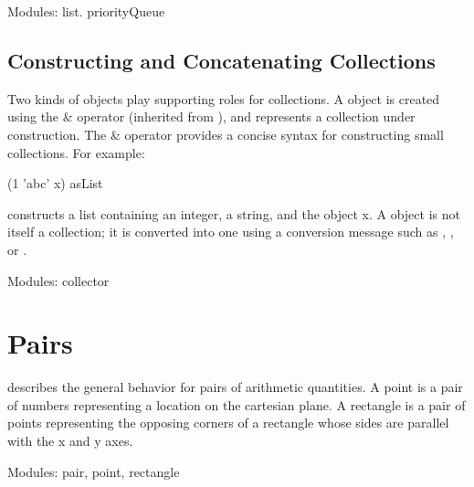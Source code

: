 \documentclass[letterpaper,10pt,english]{sphinxmanual}
\begin{document}
Modules: list. priorityQueue


\subsection{Constructing and Concatenating Collections}
\label{\detokenize{collections:constructing-and-concatenating-collections}}
\begin{sphinxVerbatim}[commandchars=\\\{\}]
\end{sphinxVerbatim}

Two kinds of objects play supporting roles for collections. A  object is created using
the \& operator (inherited from ), and represents a collection under construction.
The \& operator provides a concise syntax for constructing small collections. For example:

\begin{sphinxVerbatim}[commandchars=\\\{\}]
(1 \PYGZam{} ’abc’ \PYGZam{} x) asList
\end{sphinxVerbatim}

constructs a list containing an integer, a string, and the object x. A  object is not itself
a collection; it is converted into one using a conversion message such as , , or
.

Modules: collector


\section{Pairs}
\label{\detokenize{pairs:pairs}}\label{\detokenize{pairs::doc}}
\begin{sphinxVerbatim}[commandchars=\\\{\}]
\end{sphinxVerbatim}

 describes the general behavior for pairs of arithmetic quantities. A point is a pair of
numbers representing a location on the cartesian plane. A rectangle is a pair of points representing
the opposing corners of a rectangle whose sides are parallel with the x and y axes.

Modules: pair, point, rectangle
\end{document}
